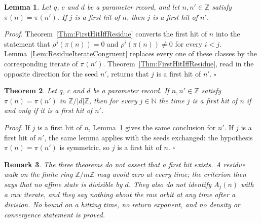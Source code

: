 \documentclass[11pt,letterpaper]{article}
\newcommand{\N}{\mathbb{N}}
\newcommand{\Z}{\mathbb{Z}}
\newtheorem{theorem}{Theorem}
\newtheorem{lemma}[theorem]{Lemma}
\newtheorem{remark}[theorem]{Remark}
\newenvironment{proof}{\noindent\textit{Proof.}}{\hfill\(\square\)}
\begin{document}
\begin{lemma}\label{Lem:FirstHitOfCongruent}
Let \(q\), \(c\) and \(d\) be a parameter record, and let \(n,n'\in\Z\) satisfy
\(\pi(n)=\pi(n')\). If \(j\) is a first hit of \(n\), then \(j\) is a first hit
of \(n'\).
\end{lemma}

\begin{proof}
Theorem~\ref{Thm:FirstHitIffResidue} converts the first hit of \(n\) into the
statement that \(\rho^{j}(\pi(n))=0\) and \(\rho^{i}(\pi(n))\neq 0\) for every
\(i<j\). Lemma~\ref{Lem:ResidueIterateCongruent} replaces every one of these
classes by the corresponding iterate of \(\pi(n')\).
Theorem~\ref{Thm:FirstHitIffResidue}, read in the opposite direction for the
seed \(n'\), returns that \(j\) is a first hit of \(n'\).
\end{proof}

\begin{theorem}\label{Thm:FirstHitCongruent}
Let \(q\), \(c\) and \(d\) be a parameter record. If \(n,n'\in\Z\) satisfy
\(\pi(n)=\pi(n')\) in \(\Z/|d|\Z\), then for every \(j\in\N\) the time \(j\) is
a first hit of \(n\) if and only if it is a first hit of \(n'\).
\end{theorem}

\begin{proof}
If \(j\) is a first hit of \(n\), Lemma~\ref{Lem:FirstHitOfCongruent} gives the
same conclusion for \(n'\). If \(j\) is a first hit of \(n'\), the same lemma
applies with the seeds exchanged: the hypothesis \(\pi(n)=\pi(n')\) is
symmetric, so \(j\) is a first hit of \(n\).
\end{proof}

\begin{remark}
The three theorems do not assert that a first hit exists. A residue walk on
the finite ring \(\Z/m\Z\) may avoid zero at every time; the criterion then
says that no affine state is divisible by \(d\). They also do not identify
\(A_{j}(n)\) with a raw iterate, and they say nothing about the raw orbit at
any time after a division. No bound on a hitting time, no return exponent, and
no density or convergence statement is proved.
\end{remark}
\end{document}

